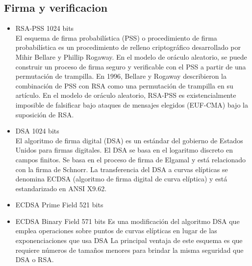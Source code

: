 \documentclass[../main.tex]{subfiles}
\begin{document}
\subsection{Firma y verificacion}\label{sec:firma-y-verificacion-2}
\begin{itemize}
  \item RSA-PSS 1024 bits\\
        El esquema de firma probabilística (PSS) o procedimiento de firma probabilística es un procedimiento
        de relleno criptográfico desarrollado por Mihir Bellare y Phillip Rogaway. En el modelo de oráculo
        aleatorio, se puede construir un proceso de firma seguro y verificable con el PSS a partir de una
        permutación de trampilla. En 1996, Bellare y Rogaway describieron la combinación de PSS con RSA
        como una permutación de trampilla en su artículo. En el modelo de oráculo aleatorio, RSA-PSS es
        existencialmente imposible de falsificar bajo ataques de mensajes elegidos (EUF-CMA)
        bajo la suposición de RSA.\@
  \item DSA 1024 bits\\
        El algoritmo de firma digital (DSA) es un estándar del gobierno de Estados Unidos para firmas digitales.
        El DSA se basa en el logaritmo discreto en campos finitos. Se basa en el proceso de firma de Elgamal y está
        relacionado con la firma de Schnorr. La transferencia del DSA a curvas elípticas se denomina ECDSA
        (algoritmo de firma digital de curva elíptica) y está estandarizado en ANSI X9.62.
  \item ECDSA Prime Field 521 bits
  \item ECDSA Binary Field 571 bits
        Es una modificación del algoritmo DSA que emplea operaciones sobre puntos de curvas elípticas en lugar
        de las exponenciaciones que usa DSA La principal ventaja de este esquema es que requiere números de
        tamaños menores para brindar la misma seguridad que DSA o RSA.\@
\end{itemize}
\end{document}
